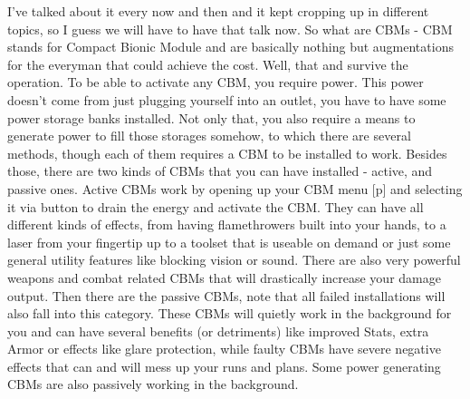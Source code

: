 \documentclass[11pt]{report}
\begin{document}
I've talked about it every now and then and it kept cropping up in different topics, so I guess we will have to have that talk now. So what are CBMs - CBM stands for Compact Bionic Module and are basically nothing but augmentations for the everyman that could achieve the cost. Well, that and survive the operation.
To be able to activate any CBM, you require power. This power doesn't come from just plugging yourself into an outlet, you have to have some power storage banks installed. Not only that, you also require a means to generate power to fill those storages somehow, to which there are several methods, though each of them requires a CBM to be installed to work. Besides those, there are two kinds of CBMs that you can have installed - active, and passive ones.
Active CBMs work by opening up your CBM menu [p] and selecting it via button to drain the energy and activate the CBM. They can have all different kinds of effects, from having flamethrowers built into your hands, to a laser from your fingertip up to a toolset that is useable on demand or just some general utility features like blocking vision or sound. There are also very powerful weapons and combat related CBMs that will drastically increase your damage output.
Then there are the passive CBMs, note that all failed installations will also fall into this category. These CBMs will quietly work in the background for you and can have several benefits (or detriments) like improved Stats, extra Armor or effects like glare protection, while faulty CBMs have severe negative effects that can and will mess up your runs and plans. Some power generating CBMs are also passively working in the background.
\end{document}

